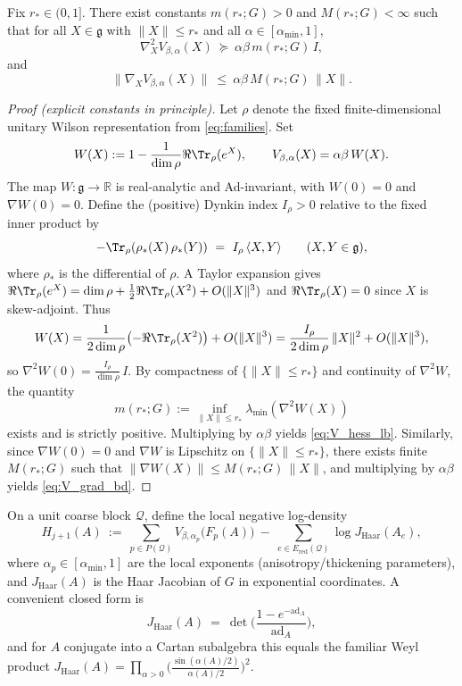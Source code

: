 \begin{lemma}\label{lem:radial_hess}
Fix $r_\ast\in(0,1]$. There exist constants $m(r_\ast;G)>0$ and $M(r_\ast;G)<\infty$ such that for all $X\in\mathfrak g$ with $\|X\|\le r_\ast$
and all $\alpha\in[\alpha_{\min},1]$,
\begin{equation}\label{eq:V_hess_lb}
\nabla_X^2 V_{\beta,\alpha}(X)\ \succeq\ \alpha\beta\,m(r_\ast;G)\,I,
\end{equation}
and
\begin{equation}\label{eq:V_grad_bd}
\|\nabla_X V_{\beta,\alpha}(X)\|\ \le\ \alpha\beta\,M(r_\ast;G)\,\|X\|.
\end{equation}
\end{lemma}

\begin{proof}[Proof (explicit constants in principle)]
Let $\rho$ denote the fixed finite-dimensional unitary Wilson representation from \eqref{eq:families}.
Set
\[
W(X):=1-\frac{1}{\dim\rho}\Re\Tr_{\rho}(e^{X}),\qquad V_{\beta,\alpha}(X)=\alpha\beta\,W(X).
\]
The map $W:\mathfrak g\to\mathbb R$ is real-analytic and Ad-invariant, with $W(0)=0$ and $\nabla W(0)=0$.
Define the (positive) Dynkin index $I_{\rho}>0$ relative to the fixed inner product by
\[
-\Tr_{\rho}(\rho_{\ast}(X)\,\rho_{\ast}(Y))\ =\ I_{\rho}\,\langle X,Y\rangle\qquad (X,Y\in\mathfrak g),
\]
where $\rho_{\ast}$ is the differential of $\rho$.
A Taylor expansion gives
$\Re\Tr_{\rho}(e^{X})=\dim\rho+\tfrac12\Re\Tr_{\rho}(X^{2})+O(\|X\|^{3})$ and $\Re\Tr_{\rho}(X)=0$ since $X$ is skew-adjoint.
Thus
\[
W(X)=\frac{1}{2\dim\rho}\bigl(-\Re\Tr_{\rho}(X^{2})\bigr)+O(\|X\|^{3})
=\frac{I_{\rho}}{2\dim\rho}\,\|X\|^{2}+O(\|X\|^{3}),
\]
so $\nabla^{2}W(0)=\frac{I_{\rho}}{\dim\rho}\,I$.
By compactness of $\{\|X\|\le r_\ast\}$ and continuity of $\nabla^{2}W$, the quantity
\[ m(r_{\ast};G):=\inf_{\|X\|\le r_\ast}\lambda_{\min}(\nabla^{2}W(X)) \]
exists and is strictly positive.
Multiplying by $\alpha\beta$ yields \eqref{eq:V_hess_lb}.
Similarly, since $\nabla W(0)=0$ and $\nabla W$ is Lipschitz on $\{\|X\|\le r_\ast\}$, there exists finite $M(r_\ast;G)$ such that
$\|\nabla W(X)\|\le M(r_\ast;G)\,\|X\|$, and multiplying by $\alpha\beta$ yields \eqref{eq:V_grad_bd}.
\end{proof}

On a unit coarse block $\mathcal Q$, define the local negative log-density
\begin{equation}\label{eq:H_def}
H_{j+1}(A)\ :=\ \sum_{p\in P(\mathcal Q)} V_{\beta,\alpha_p}\big(F_p(A)\big)\ -\ \sum_{e\in E_{\mathrm{red}}(\mathcal Q)}\log J_{\mathrm{Haar}}(A_e),
\end{equation}
where $\alpha_p\in[\alpha_{\min},1]$ are the local exponents (anisotropy/thickening parameters),
and $J_{\mathrm{Haar}}(A)$ is the Haar Jacobian of $G$ in exponential coordinates.
A convenient closed form is
\[
J_{\mathrm{Haar}}(A)\ =\ \det\!\Big(\frac{1-e^{-\mathrm{ad}_A}}{\mathrm{ad}_A}\Big),
\]
and for $A$ conjugate into a Cartan subalgebra this equals the familiar Weyl product
$J_{\mathrm{Haar}}(A)=\prod_{\alpha>0}\big(\frac{\sin(\alpha(A)/2)}{\alpha(A)/2}\big)^2$.

